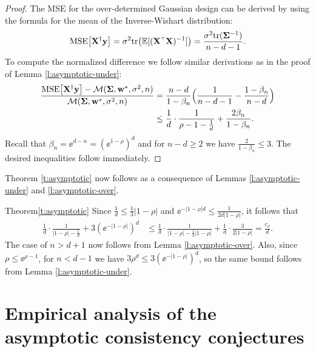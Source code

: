 \begin{proof}
The MSE for the over-determined Gaussian design can be derived by
using the formula for the mean of the Inverse-Wishart distribution:
\begin{align*}
  \MSE{\X^\dagger\y}=\sigma^2\tr\big(\E[(\X^\top\X)^{-1}]\big) =
  \frac{\sigma^2\tr(\Sigmab^{-1}) }{n-d-1}.
\end{align*}
To compute the normalized difference we follow similar derivations as
in the proof of Lemma \ref{l:asymptotic-under}:
\begin{align*}
 \frac{{\mathrm{MSE}\big[\mathbf X^\dagger\mathbf y\big]}-\mathcal M(\mathbf{\Sigma}, \mathbf w^*,\sigma^2,n)}{\mathcal M(\mathbf{\Sigma},
    \mathbf w^*,\sigma^2,n)}
    &=  \frac {n-d}{1-\beta_n}
      \Big(\frac1{n-d-1}-\frac{1-\beta_n}{n-d}\Big)\\
  &\leq\frac1d\cdot\frac1{\rho-1-\frac1d} + \frac{2\beta_n}{1-\beta_n}.
\end{align*}
Recall that $\beta_n = \ee^{d-n} = (\ee^{1-\rho})^d$ and for $n-d\geq
2$ we have $\frac2{1-\beta_n}\leq 3$. The desired inequalities follow immediately.
\end{proof}
Theorem \ref{t:asymptotic} now follows as a consequence of
Lemmas \ref{l:asymptotic-under} and \ref{l:asymptotic-over}.
\begin{proofof}{Theorem}{\ref{t:asymptotic}}
  Since $\frac1d\leq \frac13|1-\rho|$ and $\ee^{-|1-\rho|d}\leq
  \frac1{2d|1-\rho|}$, it follows that
  \begin{align*}
    \frac1d\cdot \frac{1}{|1-\rho|-\frac1d} + 3(\ee^{-|1-\rho|})^d
    &\leq \frac1d\cdot \frac{1}{|1-\rho|-\frac13|1-\rho|} +
      \frac1d\cdot\frac{3}{2|1-\rho|}=\frac {c_\rho}{d}.
  \end{align*}
  The case of $n>d+1$ now follows from Lemma
  \ref{l:asymptotic-over}. Also, since $\rho\leq \ee^{\rho-1}$, for
$n<d-1$ we have $3\rho^d\leq 3(\ee^{-|1-\rho|})^{d}$, so the same bound follows
from Lemma \ref{l:asymptotic-under}.
\end{proofof}

\section{Empirical analysis of the asymptotic consistency conjectures}
\label{sec:asymp-conj-details}

